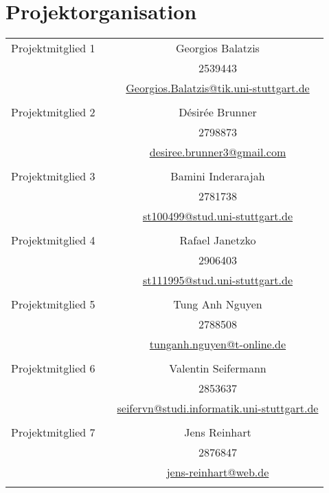 \section{Projektorganisation}
\begin{center}
	\begin{longtable}{ p{4cm}  p{4cm} c}
		Projektmitglied 1 & & Georgios Balatzis \\
		& \matr & 2539443 \\
		& \email & \href{mailto:Georgios.Balatzis@tik.uni-stuttgart.de}{Georgios.Balatzis@tik.uni-stuttgart.de} \\
		\\
		Projektmitglied 2 & & Désirée Brunner \\
		& \matr & 2798873 \\
		& \email & \href{mailto:desiree.brunner3@gmail.com}{desiree.brunner3@gmail.com} \\
		\\
		Projektmitglied 3 & & Bamini Inderarajah \\
		& \matr & 2781738 \\
		& \email & \href{mailto:st100499@stud.uni-stuttgart.de}{st100499@stud.uni-stuttgart.de} \\
		\\
		Projektmitglied 4 & & Rafael Janetzko \\
		& \matr &  2906403 \\
		& \email & \href{mailto:st111995@stud.uni-stuttgart.de}{st111995@stud.uni-stuttgart.de} \\
		\\
		Projektmitglied 5 & & Tung Anh Nguyen \\
		& \matr & 2788508 \\
		& \email & \href{mailto:tunganh.nguyen@t-online.de}{tunganh.nguyen@t-online.de} \\
		\\
		Projektmitglied 6 & & Valentin Seifermann \\
		& \matr & 2853637 \\
		& \email & \href{mailto:seifervn@studi.informatik.uni-stuttgart.de}{seifervn@studi.informatik.uni-stuttgart.de} \\
		\\
		Projektmitglied 7 & & Jens Reinhart \\
		& \matr & 2876847 \\
		& \email & \href{mailto:jens-reinhart@web.de}{jens-reinhart@web.de} \\
		\\

\end{longtable}
\end{center}
